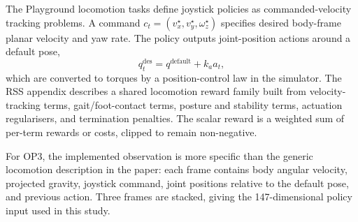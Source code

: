 The Playground locomotion tasks define joystick policies as commanded-velocity tracking problems. A command $c_t=(v_x^\star,v_y^\star,\omega_z^\star)$ specifies desired body-frame planar velocity and yaw rate. The policy outputs joint-position actions around a default pose,
\[
q^{\mathrm{des}}_t = q^{\mathrm{default}} + k_a a_t,
\]
which are converted to torques by a position-control law in the simulator. The RSS appendix describes a shared locomotion reward family built from velocity-tracking terms, gait/foot-contact terms, posture and stability terms, actuation regularisers, and termination penalties. The scalar reward is a weighted sum of per-term rewards or costs, clipped to remain non-negative.

For OP3, the implemented observation is more specific than the generic locomotion description in the paper: each frame contains body angular velocity, projected gravity, joystick command, joint positions relative to the default pose, and previous action. Three frames are stacked, giving the 147-dimensional policy input used in this study.

